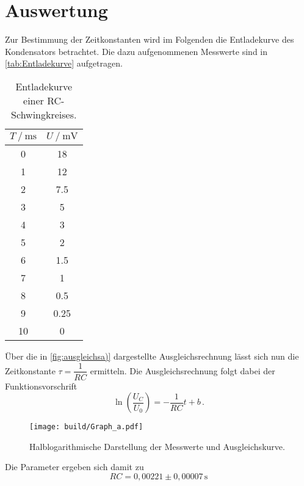\section{Auswertung}
\label{sec:Auswertung}

Zur Bestimmung der Zeitkonstanten wird im Folgenden die Entladekurve des Kondensators betrachtet.
Die dazu aufgenommenen Messwerte sind in \autoref{tab:Entladekurve} aufgetragen. 

\begin{table}[H]
  \centering
  \caption{Entladekurve einer RC-Schwingkreises.}
  \label{tab:Entladekurve}
  \begin{tabular}{S S}
    \toprule
    {$T \mathbin{/} \unit{\milli\second} $} &  {$ U \mathbin{/} \unit{\milli\volt}$} \\
          &         18     \\
            1      &         12     \\
            2      &         7.5    \\
            3      &         5      \\
            4      &         3      \\
            5      &         2      \\
            6      &         1.5    \\
            7      &         1      \\
            8      &         0.5    \\
            9      &         0.25   \\
            10     &         0      \\
  \end{tabular}
\end{table}

Über die in \autoref{fig:ausgleichsa)} dargestellte Ausgleichsrechnung lässt sich nun die Zeitkonstante $τ = \dfrac{1}{RC}$ ermitteln.
Die Ausgleichsrechnung folgt dabei der Funktionsvorschrift
\begin{equation*}
  \ln(\frac{U_C}{U_0}) = -\frac{1}{RC} t + b \,.
\end{equation*}

\begin{figure}
  \centering
  \texttt{[image: build/Graph\_a.pdf]}
  \caption{Halblogarithmische Darstellung der Messwerte und Ausgleichskurve.}
  \label{fig:ausgleichsa)}
\end{figure}

Die Parameter ergeben sich damit zu 
\begin{equation*}
  RC = 0,00221 \pm 0,00007 \,\unit{\second}
\end{equation*} 

